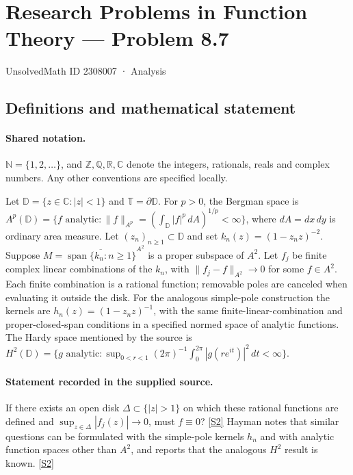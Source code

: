 \documentclass[11pt]{book}
\newcommand{\sref}[2]{\hyperlink{source:#1:#2}{[S#2]}}
\begin{document}
\setcounter{section}{2308006}
\section{Research Problems in Function Theory — Problem 8.7}\label{2308007}
{\small\sffamily UnsolvedMath ID 2308007 · Analysis}
\subsection{Definitions and mathematical statement}

\paragraph{Shared notation.}$\mathbb N=\{1,2,\ldots\}$, and $\mathbb Z,\mathbb Q,\mathbb R,\mathbb C$ denote the integers, rationals, reals and complex numbers. Any other conventions are specified locally.


Let $\mathbb D=\{z\in\mathbb C:|z|<1\}$ and $\mathbb T=\partial\mathbb D$. For $p>0$, the Bergman space is $A^p(\mathbb D)=\{f\text{ analytic}:\|f\|_{A^p}=(\int_{\mathbb D}|f|^p\,dA)^{1/p}<\infty\}$, where $dA=dx\,dy$ is ordinary area measure. Let $(z_n)_{n\ge1}\subset\mathbb D$ and set $k_n(z)=(1-z_nz)^{-2}$. Suppose $M=\overline{\operatorname{span}\{k_n:n\ge1\}}^{A^2}$ is a proper subspace of $A^2$. Let $f_j$ be finite complex linear combinations of the $k_n$, with $\|f_j-f\|_{A^2}\to0$ for some $f\in A^2$. Each finite combination is a rational function; removable poles are canceled when evaluating it outside the disk. For the analogous simple-pole construction the kernels are $h_n(z)=(1-z_nz)^{-1}$, with the same finite-linear-combination and proper-closed-span conditions in a specified normed space of analytic functions. The Hardy space mentioned by the source is $H^2(\mathbb D)=\{g\text{ analytic}:\sup_{0<r<1}(2\pi)^{-1}\int_0^{2\pi}|g(re^{it})|^2\,dt<\infty\}$.
\paragraph{Statement recorded in the supplied source.}
If there exists an open disk $\Delta\subset\{|z|>1\}$ on which these rational functions are defined and $\sup_{z\in\Delta}|f_j(z)|\to0$, must $f\equiv0$? \sref{2308007}{2}
Hayman notes that similar questions can be formulated with the simple-pole kernels $h_n$ and with analytic function spaces other than $A^2$, and reports that the analogous $H^2$ result is known. \sref{2308007}{2}
\end{document}
